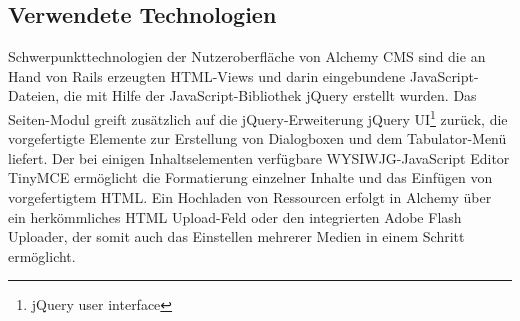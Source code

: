 \subsection{Verwendete Technologien}
Schwerpunkttechnologien der Nutzeroberfläche von Alchemy CMS sind die an Hand von Rails erzeugten HTML-Views und darin eingebundene JavaScript-Dateien, die mit Hilfe der JavaScript-Bibliothek jQuery erstellt wurden.
Das Seiten-Modul greift zusätzlich auf die jQuery-Erweiterung  jQuery UI\footnote{jQuery user interface} zurück, die vorgefertigte Elemente zur Erstellung von Dialogboxen und dem Tabulator-Menü liefert.
Der bei einigen Inhaltselementen verfügbare WYSIWJG-JavaScript Editor TinyMCE ermöglicht die Formatierung einzelner Inhalte und das Einfügen von vorgefertigtem HTML.
Ein Hochladen von Ressourcen erfolgt in Alchemy über ein herkömmliches HTML Upload-Feld oder den integrierten Adobe Flash Uploader, der somit auch das Einstellen mehrerer Medien in einem Schritt ermöglicht.




\newpage
